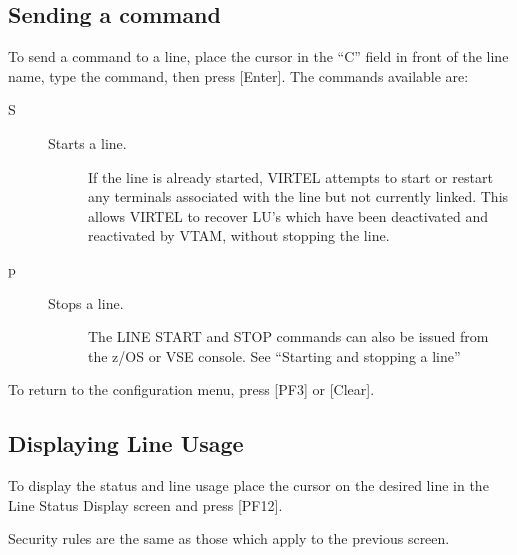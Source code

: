 \documentclass[letterpaper,10pt,english]{sphinxmanual}
\begin{document}

\subsection{Sending a command}
\label{\detokenize{audit_operations_ and_performance:sending-a-command}}\label{\detokenize{audit_operations_ and_performance:index-37}}
To send a command to a line, place the cursor in the “C” field in front of the line name, type the command, then press {[}Enter{]}. The  commands available are:
\begin{description}
\item[{S}] \leavevmode\begin{description}
\item[{Starts a line.}] \leavevmode
If the line is already started, VIRTEL attempts to start or restart any terminals associated with the line but not currently linked. This allows VIRTEL to recover LU’s which have been     deactivated and reactivated by VTAM, without stopping the line.

\end{description}

\item[{p}] \leavevmode\begin{description}
\item[{Stops a line.}] \leavevmode
The LINE START and STOP commands can also be issued from the z/OS or VSE console. See “Starting and stopping a line”

\end{description}

\end{description}

To return to the configuration menu, press {[}PF3{]} or {[}Clear{]}.


\subsection{Displaying Line Usage}
\label{\detokenize{audit_operations_ and_performance:index-38}}\label{\detokenize{audit_operations_ and_performance:displaying-line-usage}}
To display the status and line usage place the cursor on the desired line in the Line Status Display screen and press {[}PF12{]}.

Security rules are the same as those which apply to the previous screen.
\end{document}
